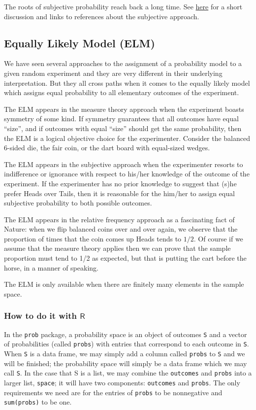 \documentclass[captions=tableheading]{scrbook}
\begin{document}
The roots of subjective probability reach back a long time. See \href{http://en.wikipedia.org/wiki/Subjective_probability}{here} for a short discussion and links to references about the subjective approach.
\subsection{Equally Likely Model (ELM)}
\label{sec-4-3-4}


We have seen several approaches to the assignment of a probability model to a given random experiment and they are very different in their underlying interpretation. But they all cross paths when it comes to the equally likely model which assigns equal probability to all elementary outcomes of the experiment.

The ELM appears in the measure theory approach when the experiment boasts symmetry of some kind. If symmetry guarantees that all outcomes have equal ``size'', and if outcomes with equal ``size'' should get the same probability, then the ELM is a logical objective choice for the experimenter. Consider the balanced 6-sided die, the fair coin, or the dart board with equal-sized wedges.

The ELM appears in the subjective approach when the experimenter resorts to indifference or ignorance with respect to his/her knowledge of the outcome of the experiment. If the experimenter has no prior knowledge to suggest that (s)he prefer Heads over Tails, then it is reasonable for the him/her to assign equal subjective probability to both possible outcomes.

The ELM appears in the relative frequency approach as a fascinating fact of Nature: when we flip balanced coins over and over again, we observe that the proportion of times that the coin comes up Heads tends to \(1/2\). Of course if we assume that the measure theory applies then we can prove that the sample proportion must tend to 1/2 as expected, but that is putting the cart before the horse, in a manner of speaking.

The ELM is only available when there are finitely many elements in the sample space.
\subsubsection{How to do it with \(\mathsf{R}\)}
\label{sec-4-3-4-1}


In the \texttt{prob} package, a probability space is an object of outcomes \texttt{S} and a vector of probabilities (called \texttt{probs}) with entries that correspond to each outcome in \texttt{S}. When \texttt{S} is a data frame, we may simply add a column called \texttt{probs} to \texttt{S} and we will be finished; the probability space will simply be a data frame which we may call \texttt{S}. In the case that S is a list, we may combine the \texttt{outcomes} and \texttt{probs} into a larger list, \texttt{space}; it will have two components: \texttt{outcomes} and \texttt{probs}. The only requirements we need are for the entries of \texttt{probs} to be nonnegative and \texttt{sum(probs)} to be one.
\end{document}
